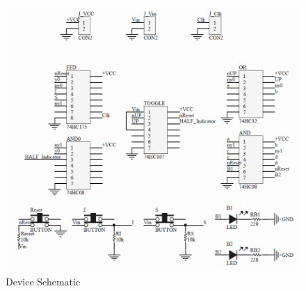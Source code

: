 \begin{figure}[H]
    \begin{center}
        \includegraphics[scale=0.5]{../Exercise1/Moore/report/schematic.png}
        \caption{Device Schematic}
        \label{fig:moore_schem}
    \end{center}
\end{figure}

